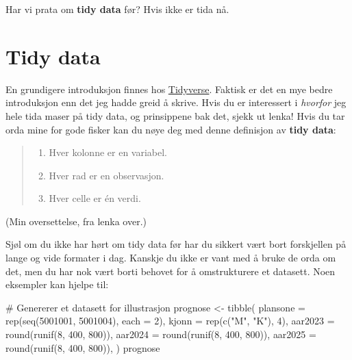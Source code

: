 \documentclass[
  letterpaper,
  DIV=11,
  numbers=noendperiod]{scrreprt}
\newenvironment{Shaded}{\begin{snugshade}}{\end{snugshade}}
\newcommand{\AttributeTok}[1]{\textcolor[rgb]{0.40,0.45,0.13}{#1}}
\newcommand{\CommentTok}[1]{\textcolor[rgb]{0.37,0.37,0.37}{#1}}
\newcommand{\DecValTok}[1]{\textcolor[rgb]{0.68,0.00,0.00}{#1}}
\newcommand{\FunctionTok}[1]{\textcolor[rgb]{0.28,0.35,0.67}{#1}}
\newcommand{\NormalTok}[1]{\textcolor[rgb]{0.00,0.23,0.31}{#1}}
\newcommand{\OtherTok}[1]{\textcolor[rgb]{0.00,0.23,0.31}{#1}}
\newcommand{\StringTok}[1]{\textcolor[rgb]{0.13,0.47,0.30}{#1}}
\providecommand{\tightlist}{%
  \setlength{\itemsep}{0pt}\setlength{\parskip}{0pt}}\usepackage{longtable,booktabs,array}
\begin{document}
Har vi prata om \textbf{tidy data} før? Hvis ikke er tida nå.

\hypertarget{tidy-data}{%
\section{Tidy data}\label{tidy-data}}

En grundigere introduksjon finnes hos
\href{https://tidyr.tidyverse.org/articles/tidy-data.html}{Tidyverse}.
Faktisk er det en mye bedre introduksjon enn det jeg hadde greid å
skrive. Hvis du er interessert i \emph{hvorfor} jeg hele tida maser på
tidy data, og prinsippene bak det, sjekk ut lenka! Hvis du tar orda mine
for gode fisker kan du nøye deg med denne definisjon av \textbf{tidy
data}:

\begin{quote}
\begin{enumerate}
\def\labelenumi{\arabic{enumi}.}
\tightlist
\item
  Hver kolonne er en variabel.
\item
  Hver rad er en observasjon.
\item
  Hver celle er én verdi.
\end{enumerate}
\end{quote}

(Min oversettelse, fra lenka over.)

Sjøl om du ikke har hørt om tidy data før har du sikkert vært bort
forskjellen på lange og vide formater i dag. Kanskje du ikke er vant med
å bruke de orda om det, men du har nok vært borti behovet for å
omstrukturere et datasett. Noen eksempler kan hjelpe til:

\begin{Shaded}
\begin{Highlighting}[]
\CommentTok{\# Genererer et datasett for illustrasjon}
\NormalTok{prognose }\OtherTok{\textless{}{-}} \FunctionTok{tibble}\NormalTok{(}
  \AttributeTok{plansone =} \FunctionTok{rep}\NormalTok{(}\FunctionTok{seq}\NormalTok{(}\DecValTok{5001001}\NormalTok{, }\DecValTok{5001004}\NormalTok{), }\AttributeTok{each =} \DecValTok{2}\NormalTok{),}
  \AttributeTok{kjonn =} \FunctionTok{rep}\NormalTok{(}\FunctionTok{c}\NormalTok{(}\StringTok{"M"}\NormalTok{, }\StringTok{"K"}\NormalTok{), }\DecValTok{4}\NormalTok{),}
  \AttributeTok{aar2023 =} \FunctionTok{round}\NormalTok{(}\FunctionTok{runif}\NormalTok{(}\DecValTok{8}\NormalTok{, }\DecValTok{400}\NormalTok{, }\DecValTok{800}\NormalTok{)),}
  \AttributeTok{aar2024 =} \FunctionTok{round}\NormalTok{(}\FunctionTok{runif}\NormalTok{(}\DecValTok{8}\NormalTok{, }\DecValTok{400}\NormalTok{, }\DecValTok{800}\NormalTok{)),}
  \AttributeTok{aar2025 =} \FunctionTok{round}\NormalTok{(}\FunctionTok{runif}\NormalTok{(}\DecValTok{8}\NormalTok{, }\DecValTok{400}\NormalTok{, }\DecValTok{800}\NormalTok{)),}
\NormalTok{)}
\NormalTok{prognose}
\end{Highlighting}
\end{Shaded}
\end{document}

